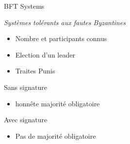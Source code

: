 \documentclass[presentation]{beamer}
\begin{document}
\begin{frame}[label={sec:org1238962}]{BFT Systems}
\begin{block}{\emph{Systèmes tolérants aux fautes Byzantines}}
\begin{itemize}
\item Nombre et participants connus
\item Election d'un leader
\item Traites Punis
\end{itemize}

\begin{block}{Sans signature}
\begin{itemize}
\item honnête majorité obligatoire
\end{itemize}
\end{block}
\begin{block}{Avec signature}
\begin{itemize}
\item Pas de majorité obligatoire
\end{itemize}
\end{block}
\end{block}
\end{frame}
\end{document}
